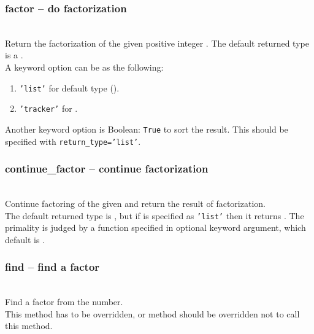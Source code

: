   \subsubsection{factor -- do factorization}
   \\
   \spacing
   \quad Return the factorization of the given positive integer .
   \spacing
   \quad The default returned type is a .\\
   \quad A keyword option  can be as the following:
   \begin{enumerate}
   \item {\tt 'list'} for default type ().
   \item {\tt 'tracker'} for .
   \end{enumerate}
   \quad Another keyword option  is Boolean:
   {\tt True} to sort the result.
   This should be specified with {\tt return\_type='list'}.\\
%
  \subsubsection{\negok continue\_factor -- continue factorization}
  \\
  \spacing
  \quad Continue factoring of the given  and return the
  result of factorization.\\
  \spacing
  \quad The default returned type is ,
  but if  is specified as {\tt 'list'}
  then it returns .
  The primality is judged by a function specified in 
  optional keyword argument, which default is .\\
%
  \subsubsection{\negok find -- find a factor}
  \\
  \spacing
  \quad Find a factor from the  number.\\
  \spacing
  \quad This method has to be overridden, or  method should be overridden not to call this method.\\
%
